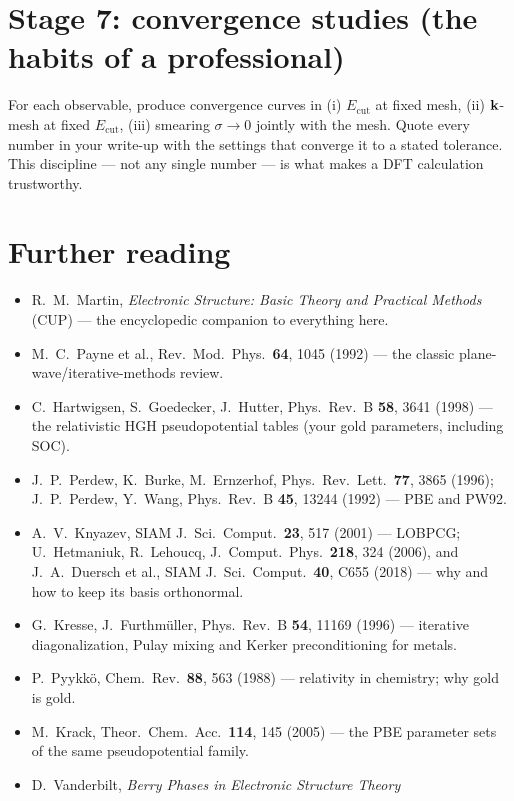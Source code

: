 \section{Stage 7: convergence studies (the habits of a professional)}
For each observable, produce convergence curves in
(i) $E_{\mathrm{cut}}$ at fixed mesh, (ii) $\mathbf{k}$-mesh at fixed
$E_{\mathrm{cut}}$, (iii) smearing $\sigma \to 0$ jointly with the mesh.
Quote every number in your write-up with the settings that converge it to a
stated tolerance. This discipline --- not any single number --- is what makes
a DFT calculation trustworthy.

\section*{Further reading}
\begin{itemize}[leftmargin=2em]
\item R.\ M.\ Martin, \emph{Electronic Structure: Basic Theory and Practical
Methods} (CUP) --- the encyclopedic companion to everything here.
\item M.\ C.\ Payne et al., Rev.\ Mod.\ Phys.\ \textbf{64}, 1045 (1992) ---
the classic plane-wave/iterative-methods review.
\item C.\ Hartwigsen, S.\ Goedecker, J.\ Hutter, Phys.\ Rev.\ B \textbf{58},
3641 (1998) --- the relativistic HGH pseudopotential tables (your gold
parameters, including SOC).
\item J.\ P.\ Perdew, K.\ Burke, M.\ Ernzerhof, Phys.\ Rev.\ Lett.\
\textbf{77}, 3865 (1996); J.\ P.\ Perdew, Y.\ Wang, Phys.\ Rev.\ B
\textbf{45}, 13244 (1992) --- PBE and PW92.
\item A.\ V.\ Knyazev, SIAM J.\ Sci.\ Comput.\ \textbf{23}, 517 (2001) ---
LOBPCG; U.\ Hetmaniuk, R.\ Lehoucq, J.\ Comput.\ Phys.\ \textbf{218}, 324
(2006), and J.\ A.\ Duersch et al., SIAM J.\ Sci.\ Comput.\ \textbf{40},
C655 (2018) --- why and how to keep its basis orthonormal.
\item G.\ Kresse, J.\ Furthm\"uller, Phys.\ Rev.\ B \textbf{54}, 11169
(1996) --- iterative diagonalization, Pulay mixing and Kerker
preconditioning for metals.
\item P.\ Pyykk\"o, Chem.\ Rev.\ \textbf{88}, 563 (1988) --- relativity in
chemistry; why gold is gold.
\item M.\ Krack, Theor.\ Chem.\ Acc.\ \textbf{114}, 145 (2005) --- the PBE
parameter sets of the same pseudopotential family.
\item D.\ Vanderbilt, \emph{Berry Phases in Electronic Structure Theory}

\end{itemize}
